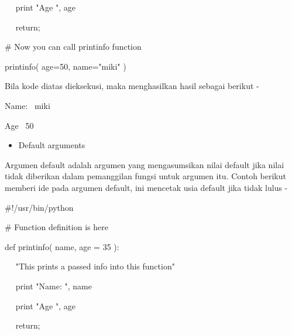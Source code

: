 \noindent 
 \hspace*{0.5in} ~~ print "Age ", age \par
\noindent 
 \hspace*{0.5in} ~~ return; \par
\vspace{12pt}
\noindent 
 \hspace*{0.5in}  $  \#  $ Now you can call printinfo function \par
\noindent 
 \hspace*{0.5in} printinfo( age=50, name="miki" ) \par
 \vspace{\baselineskip}
\noindent 
Bila kode diatas dieksekusi, maka menghasilkan hasil sebagai berikut - \par
\noindent 
 \hspace*{0.5in} Name:~ miki \par
\noindent 
 \hspace*{0.5in} Age~ 50 \par
\vspace{12pt}
\noindent 
\begin{itemize}
	\item Default arguments
\end{itemize}
\noindent 
Argumen default adalah argumen yang mengasumsikan nilai default jika nilai tidak diberikan dalam pemanggilan fungsi untuk argumen itu. Contoh berikut memberi ide pada argumen default, ini mencetak usia default jika tidak lulus - \par
\noindent 
 \hspace*{0.5in}  $  \#  $!/usr/bin/python \par
\vspace{12pt}
\noindent 
 \hspace*{0.5in}  $  \#  $ Function definition is here \par
\noindent 
 \hspace*{0.5in} def printinfo( name, age = 35 ): \par
\noindent 
 \hspace*{0.5in} ~~ "This prints a passed info into this function" \par
\noindent 
 \hspace*{0.5in} ~~ print "Name: ", name \par
\noindent 
 \hspace*{0.5in} ~~ print "Age ", age \par
\noindent 
 \hspace*{0.5in} ~~ return; \par
